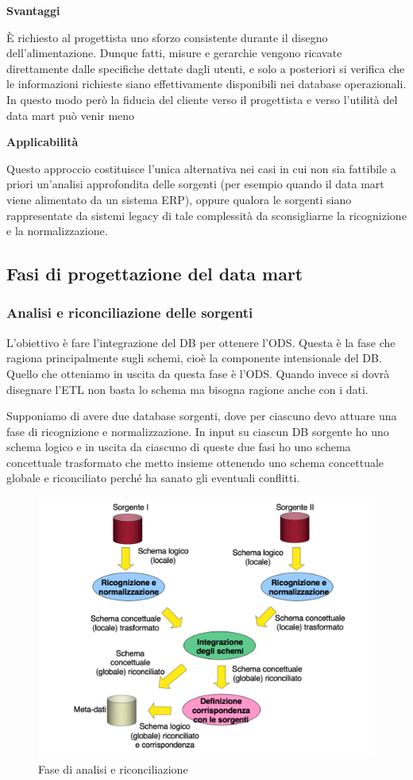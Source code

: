 \textbf{Svantaggi}

È richiesto al progettista uno sforzo consistente durante il disegno dell’alimentazione. Dunque fatti, misure e gerarchie vengono ricavate direttamente dalle specifiche dettate dagli utenti, e solo a posteriori si verifica che le informazioni richieste siano effettivamente disponibili nei database operazionali. In questo modo però la fiducia del cliente verso il progettista e verso l’utilità del data mart può venir meno

\textbf{Applicabilità}

Questo approccio costituisce l’unica alternativa nei casi in cui non sia fattibile a priori un’analisi approfondita delle sorgenti (per esempio quando il data mart viene alimentato da un sistema ERP), oppure qualora le sorgenti siano rappresentate da sistemi legacy di tale complessità da sconsigliarne la ricognizione e la normalizzazione. 

\subsection{Fasi di progettazione del data mart}
\subsubsection{Analisi e riconciliazione delle sorgenti}
L’obiettivo è fare l’integrazione del DB per ottenere l’ODS. Questa è la fase che ragiona principalmente sugli schemi, cioè la componente intensionale del DB. Quello che otteniamo in uscita da questa fase è l’ODS. 
Quando invece si dovrà disegnare l’ETL non basta lo schema ma bisogna ragione anche con i dati. 

Supponiamo di avere due database sorgenti, dove per ciascuno devo attuare una fase di ricognizione e normalizzazione. In input su ciascun DB sorgente ho uno schema logico e in uscita da ciascuno di queste due fasi ho uno schema concettuale trasformato che metto insieme ottenendo uno schema concettuale globale e riconciliato perché ha sanato gli eventuali conflitti. 
\begin{figure}[H]
	\centering
	\includegraphics[width=0.7\linewidth]{img/analisi}
	\caption{Fase di analisi e riconciliazione}
	\label{fig:analisi}
\end{figure}
